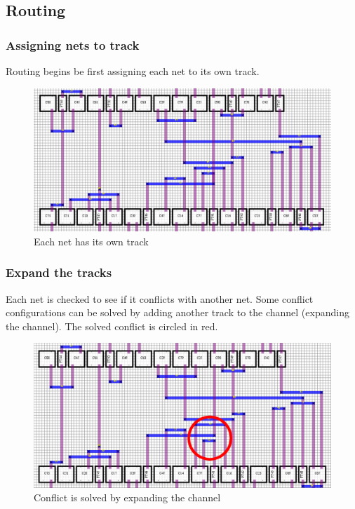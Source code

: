 \documentclass[10pt]{article}
\begin{document}
\newpage
\subsection{Routing}

    \subsubsection{Assigning nets to track}

        Routing begins be first assigning each net to its own track.

        \begin{figure}[H]
            \centering
            \includegraphics[width=\linewidth]{./route_0_crop.png}
            \caption{Each net has its own track}
        \end{figure}

    \subsubsection{Expand the tracks}

        Each net is checked to see if it conflicts with another net. Some
        conflict configurations can be solved by adding another track to the
        channel (expanding the channel). The solved conflict is circled in red.

        \begin{figure}[H]
            \centering
            \includegraphics[width=\linewidth]{./route_1_crop.png}
            \caption{Conflict is solved by expanding the channel}
        \end{figure}
\end{document}
